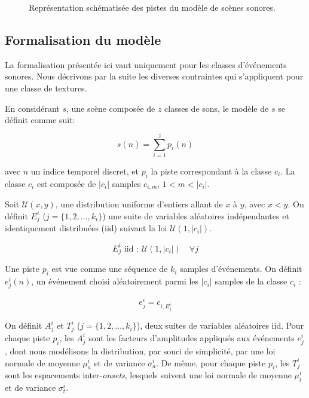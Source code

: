 \begin{figure}[t]
        \graphicspath{{gfx/ch_4/}}
        \myfloatalign
        \def\svgwidth{\linewidth}
        
       \caption{Représentation schématisée des pistes du modèle de scènes sonores.}\label{fig:modelSequence}
\end{figure}


\subsection{Formalisation du modèle}
 \label{sec:ch4_modelForm}
 
La formalisation présentée ici vaut uniquement pour les classes d'événements sonores. Nous décrivons par la suite les diverses contraintes qui s'appliquent pour une classe de textures.
 
En considérant $s$, une scène composée de $z$ classes de sons, le modèle de $s$ se définit comme suit:
 
\begin{equation}
s(n)=\sum_{i=1}^{z}p_i(n)
\end{equation}

avec $n$ un indice temporel discret, et $p_i$ la piste correspondant à la classe $c_i$. La classe $c_i$ est composée de $\vert c_i\vert$ samples $c_{i,m}$, $1<m<\vert c_i\vert$. 

Soit $\mathcal{U}(x,y)$, une distribution uniforme d'entiers allant de $x$ à $y$, avec $x<y$. On définit $E_j^i$ ($j=\lbrace 1,2,\ldots,k_i\rbrace$) une suite de variables aléatoires indépendantes et identiquement distribuées (iid) suivant la loi $\mathcal{U}(1,\vert c_i \vert)$.

\begin{equation}
E_j^i \textrm{ iid : } \mathcal{U}(1,\vert c_i \vert) \quad \forall j 
\end{equation}

Une piste $p_i$ est vue comme une séquence de $k_i$ samples d'événements. On définit $e_j^i(n)$, un événement choisi aléatoirement parmi les $\vert c_i\vert$ samples de la classe $c_i$ :

\begin{equation}
e_j^i=c_{i,E_j^i}
\end{equation}

On définit $A^i_j$ et $T^i_j$ ($j=\lbrace 1,2,\ldots,k_i\rbrace$), deux suites de variables aléatoires iid. Pour chaque piste $p_i$, les $A^i_j$ sont les facteurs d'amplitudes appliqués aux événements $e_j^i$, dont nous modélisons la distribution, par souci de simplicité, par une loi normale de moyenne $\mu_a^i$ et de variance $\sigma_a^i$. De même, pour chaque piste $p_i$, les $T_j^i$ sont les espacements inter-\emph{onsets}, lesquels suivent une loi normale de moyenne $\mu_t^i$ et de variance $\sigma_t^i$. 

